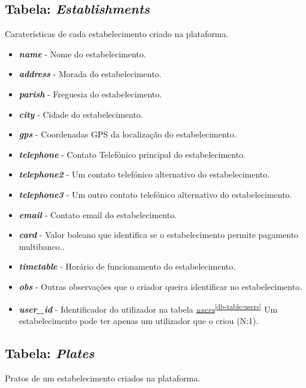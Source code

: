 \documentclass[11pt, a4paper, sans]{article}
\begin{document}
	\subsection{Tabela: \textit{Establishments}} \label{db-table-establishments}

	Caraterísticas de cada estabelecimento criado na plataforma.

	\begin{itemize}
		\item \textbf{\textit{name}} - Nome do estabelecimento.
		\item \textbf{\textit{address}} - Morada do estabelecimento.
		\item \textbf{\textit{parish}} - Freguesia do estabelecimento.
		\item \textbf{\textit{city}} - Cidade do estabelecimento.
		\item \textbf{\textit{gps}} - Coordenadas GPS da localização do estabelecimento.
		\item \textbf{\textit{telephone}} - Contato Telefónico principal do estabelecimento.
		\item \textbf{\textit{telephone2}} - Um contato telefónico alternativo do estabelecimento.
		\item \textbf{\textit{telephone3}} - Um outro contato telefónico alternativo do estabelecimento.
		\item \textbf{\textit{email}} - Contato email do estabelecimento.
		\item \textbf{\textit{card}} - Valor boleano que identifica se o estabelecimento permite pagamento
			multibanco..
		\item \textbf{\textit{timetable}} - Horário de funcionamento do estabelecimento.
		\item \textbf{\textit{obs}} - Outras observações que o criador queira identificar no estabelecimento.
		\item \textbf{\textit{user\_id}} - Identificador do utilizador na tabela 
			\underline{\textit{users}}\textsuperscript{\ref{db-table-users}} 
			Um estabelecimento pode ter apenas um utilizador que o criou (N:1).
	\end{itemize}

	\subsection{Tabela: \textit{Plates}} \label{db-table-plates}

	Pratos de um estabelecimento criados na plataforma.
\end{document}
